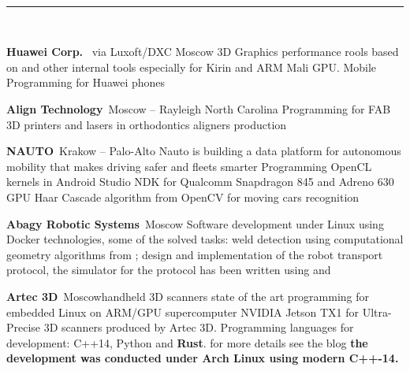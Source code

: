 \documentclass[11pt,a4paper,roman]{moderncv}
\newcommand{\strong}[1]{{\color{UniBlue}\textbf{#1}}}
\newcommand{\HRule}{{\color{UniBlue}\rule{\linewidth}{0.3mm}}}
\renewcommand{\section}[1]{\vspace{1cm}{\Large\strong{#1}} \\[0.005mm] \HRule \\ \vspace{-0.3cm}}
\begin{document}
\section{\strong{Experience}}

    {{\bfseries{Huawei Corp.}}\  via Luxoft/DXC }{Moscow}{}{
        3D Graphics performance rools based on  and other internal tools especially for Kirin and ARM Mali GPU. Mobile Programming for Huawei phones
}

  {{\bfseries{Align Technology}}\  }{Moscow -- Rayleigh North Carolina}{} {
  Programming for FAB 3D printers and lasers in orthodontics aligners production
}

  {{\bfseries{NAUTO}}\  }{Krakow -- Palo-Alto}
  {Nauto is building a data platform for autonomous mobility that makes driving safer and fleets smarter} {
  Programming OpenCL kernels in Android Studio NDK for Qualcomm Snapdragon 845 and Adreno 630 GPU
  Haar Cascade algorithm from OpenCV for moving cars recognition
}

  {{\bfseries{Abagy Robotic Systems}}\  }{Moscow}{} {
  Software development under Linux using Docker technologies, some of the solved tasks: weld detection using computational geometry algorithms from
  ; design and implementation of the robot transport protocol, the simulator for the protocol has been written using  and 
}

    {{\bfseries{Artec 3D}}\  }{Moscow}{handheld 3D scanners} {
        state of the art programming for embedded Linux on ARM/GPU supercomputer NVIDIA Jetson TX1 for Ultra-Precise 3D scanners produced by Artec 3D. Programming languages for development: C++14, Python and \textbf{Rust}.
  for more details see the blog  \bfseries{the development was conducted under Arch Linux using modern C++-14}.
}
\end{document}
